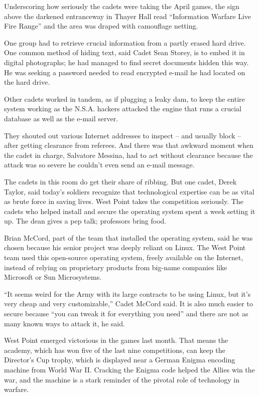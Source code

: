 \documentclass[12pt,a4paper,onecolumn]{article}
\begin{document}
Underscoring how seriously the cadets were taking the April games, the sign above the darkened
entranceway in Thayer Hall read ``Information Warfare Live Fire Range'' and the area was draped with
camouflage netting.

One group had to retrieve crucial information from a partly erased hard drive. One common method of
hiding text, said Cadet Sean Storey, is to embed it in digital photographs; he had managed to find
secret documents hidden this way. He was seeking a password needed to read encrypted e-mail he had
located on the hard drive.

Other cadets worked in tandem, as if plugging a leaky dam, to keep the entire system working as the
N.S.A. hackers attacked the engine that runs a crucial database as well as the e-mail server.

They shouted out various Internet addresses to inspect -- and usually block -- after getting
clearance from referees. And there was that awkward moment when the cadet in charge, Salvatore
Messina, had to act without clearance because the attack was so severe he couldn't even send an
e-mail message.

The cadets in this room do get their share of ribbing. But one cadet, Derek Taylor, said today's
soldiers recognize that technological expertise can be as vital as brute force in saving lives. West
Point takes the competition seriously. The cadets who helped install and secure the operating system
spent a week setting it up. The dean gives a pep talk; professors bring food.

Brian McCord, part of the team that installed the operating system, said he was chosen because his
senior project was deeply reliant on Linux. The West Point team used this open-source operating
system, freely available on the Internet, instead of relying on proprietary products from big-name
companies like Microsoft or Sun Microsystems.

``It seems weird for the Army with its large contracts to be using Linux, but it's very cheap and
very customizable,'' Cadet McCord said. It is also much easier to secure because ``you can tweak it
for everything you need'' and there are not as many known ways to attack it, he said.

West Point emerged victorious in the games last month. That means the academy, which has won five of
the last nine competitions, can keep the Director's Cup trophy, which is displayed near a German
Enigma encoding machine from World War II. Cracking the Enigma code helped the Allies win the war,
and the machine is a stark reminder of the pivotal role of technology in warfare.
\end{document}
